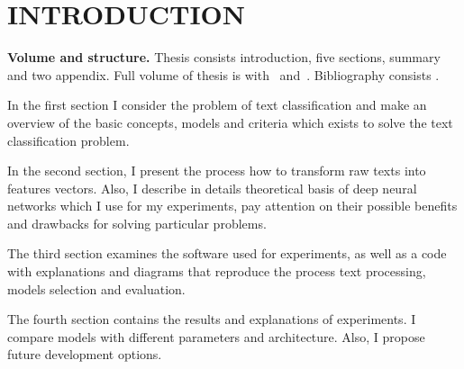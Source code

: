 \chapter*{INTRODUCTION}							%

\newcommand{\actuality}{\textbf{Relevance of the problem:}}
\newcommand{\aim}{\textbf{Objective}}
\newcommand{\tasks}{Task}
\newcommand{\defpositions}{\textbf{Основные положения, выносимые на~защиту:}}
\newcommand{\novelty}{\textbf{Scientific novelty:}}
\newcommand{\influence}{\textbf{Scientific and practical significance}}
\newcommand{\reliability}{\textbf{Степень достоверности}}
\newcommand{\probation}{\textbf{Апробация работы.}}
\newcommand{\contribution}{\textbf{Personal contribution.}}
\newcommand{\publications}{\textbf{Publications.}}

%

\textbf{Volume and structure.} Thesis consists introduction, five sections, summary and two appendix.
Full volume of thesis is  
with~
and~.
Bibliography consists .

In the first section I consider the problem of text classification and make an overview of the basic concepts, models and criteria which exists to solve the text classification problem.

In the second section, I present the process how to transform raw texts into features vectors. Also, I describe in details theoretical basis of deep neural networks which I use for my experiments, pay attention on their possible benefits and drawbacks for solving particular problems.

The third section examines the software used for experiments, as well as a code with explanations and diagrams that reproduce the process text processing, models selection and evaluation. 

The fourth section contains the results and explanations of experiments. I compare models with different parameters and architecture. Also, I propose future development options.
